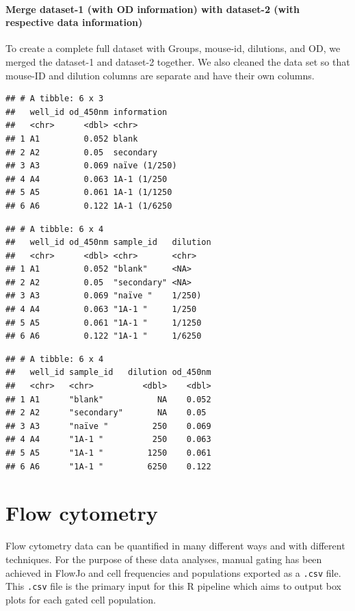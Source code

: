 \documentclass[
]{book}
\begin{document}
\hypertarget{merge-dataset-1-with-od-information-with-dataset-2-with-respective-data-information}{%
\subsubsection{Merge dataset-1 (with OD information) with dataset-2 (with respective data information)}\label{merge-dataset-1-with-od-information-with-dataset-2-with-respective-data-information}}

To create a complete full dataset with Groups, mouse-id, dilutions, and OD, we merged the dataset-1 and dataset-2 together. We also cleaned the data set so that mouse-ID and dilution columns are separate and have their own columns.

\begin{verbatim}
## # A tibble: 6 x 3
##   well_id od_450nm information  
##   <chr>      <dbl> <chr>        
## 1 A1         0.052 blank        
## 2 A2         0.05  secondary    
## 3 A3         0.069 naïve (1/250)
## 4 A4         0.063 1A-1 (1/250  
## 5 A5         0.061 1A-1 (1/1250 
## 6 A6         0.122 1A-1 (1/6250
\end{verbatim}

\begin{verbatim}
## # A tibble: 6 x 4
##   well_id od_450nm sample_id   dilution
##   <chr>      <dbl> <chr>       <chr>   
## 1 A1         0.052 "blank"     <NA>    
## 2 A2         0.05  "secondary" <NA>    
## 3 A3         0.069 "naïve "    1/250)  
## 4 A4         0.063 "1A-1 "     1/250   
## 5 A5         0.061 "1A-1 "     1/1250  
## 6 A6         0.122 "1A-1 "     1/6250
\end{verbatim}

\begin{verbatim}
## # A tibble: 6 x 4
##   well_id sample_id   dilution od_450nm
##   <chr>   <chr>          <dbl>    <dbl>
## 1 A1      "blank"           NA    0.052
## 2 A2      "secondary"       NA    0.05 
## 3 A3      "naïve "         250    0.069
## 4 A4      "1A-1 "          250    0.063
## 5 A5      "1A-1 "         1250    0.061
## 6 A6      "1A-1 "         6250    0.122
\end{verbatim}

\hypertarget{flow-cytometry}{%
\chapter{Flow cytometry}\label{flow-cytometry}}

Flow cytometry data can be quantified in many different ways and with different techniques. For the purpose of these data analyses, manual gating has been achieved in FlowJo and cell frequencies and populations exported as a \texttt{.csv} file. This \texttt{.csv} file is the primary input for this R pipeline which aims to output box plots for each gated cell population.
\end{document}
